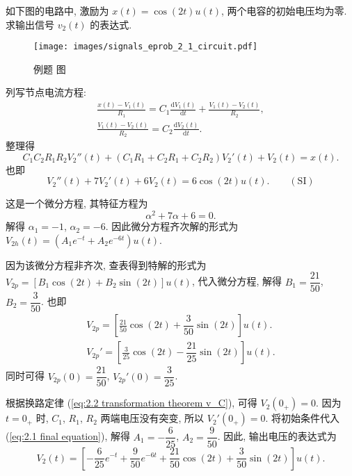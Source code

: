 \begin{exampleprob}
    如下图的电路中, 激励为 $x(t)=\cos(2t)u(t)$, 两个电容的初始电压均为零. 求输出信号 $v_2(t)$ 的表达式.

    \begin{figure}[H]
        \centering
        \texttt{[image: images/signals\_eprob\_2\_1\_circuit.pdf]}
        \caption{例题 \theexampleprob 图}
    \end{figure}

    \begin{solution}
        列写节点电流方程:
        \begin{gather*}
            \frac{x(t)-V_1(t)}{R_1}=C_1\frac{\mathrm{d}V_1(t)}{\mathrm{d}t}+\frac{V_1(t)-V_2(t)}{R_2}, \\
            \frac{V_1(t)-V_2(t)}{R_2}=C_2\frac{\mathrm{d}V_2(t)}{\mathrm{d}t}.
        \end{gather*}
        整理得
        \begin{equation*}
            C_1C_2R_1R_2V_2''(t)+(C_1R_1+C_2R_1+C_2R_2)V_2'(t)+V_2(t)=x(t).
        \end{equation*}
        也即
        \begin{equation*}
            V_2''(t)+7V_2'(t)+6V_2(t)=6\cos(2t)u(t).\qquad (\textrm{SI})
        \end{equation*}

        这是一个微分方程, 其特征方程为
        \begin{equation*}
            \alpha^2+7\alpha+6=0.
        \end{equation*}
        解得 $\alpha_1=-1$, $\alpha_2=-6$. 因此微分方程齐次解的形式为 $V_{2h}(t)=(A_1e^{-t}+A_2e^{-6t})u(t)$.

        因为该微分方程非齐次, 查表得到特解的形式为 $V_{2p}=[B_1\cos(2t)+B_2\sin(2t)]u(t)$, 代入微分方程, 解得 $B_1=\dfrac{21}{50}$, $B_2=\dfrac{3}{50}$. 也即
        \begin{gather*}
            V_{2p}=\left[\frac{21}{50}\cos(2t)+\dfrac{3}{50}\sin(2t)\right]u(t). \\
            V_{2p}'=\left[\frac{3}{25}\cos(2t)-\dfrac{21}{25}\sin(2t)\right]u(t).
        \end{gather*}
        同时可得 $V_{2p}(0)=\dfrac{21}{50}$, $V_{2p}'(0)=\dfrac{3}{25}$.

        根据换路定律 (\ref{eq:2.2 transformation theorem v_C}), 可得 $V_2(0_+)=0$. 因为 $t=0_+$ 时, $C_1$, $R_1$, $R_2$ 两端电压没有突变, 所以 $V_2'(0_+)=0$. 将初始条件代入 (\ref{eq:2.1 final equation}), 解得 $A_1=-\dfrac{6}{25}$, $A_2=\dfrac{9}{50}$. 因此, 输出电压的表达式为
        \begin{equation*}
            V_2(t)=\left[-\dfrac{6}{25}e^{-t}+\dfrac{9}{50}e^{-6t}+\dfrac{21}{50}\cos(2t)+\dfrac{3}{50}\sin(2t)\right]u(t).
        \end{equation*}
    \end{solution}
\end{exampleprob}
